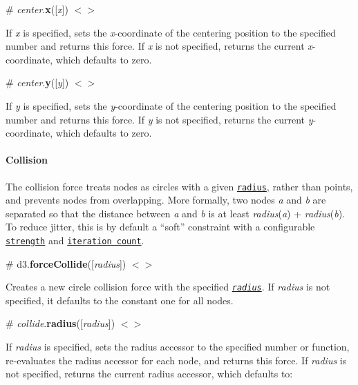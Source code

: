 \label{_center_x}%
\# {\itshape center}.{\bfseries x}(\mbox{[}{\itshape x}\mbox{]}) \href{https://github.com/d3/d3-force/blob/master/src/center.js#L27}{\tt $<$$>$}

If {\itshape x} is specified, sets the {\itshape x}-\/coordinate of the centering position to the specified number and returns this force. If {\itshape x} is not specified, returns the current {\itshape x}-\/coordinate, which defaults to zero.

\label{_center_y}%
\# {\itshape center}.{\bfseries y}(\mbox{[}{\itshape y}\mbox{]}) \href{https://github.com/d3/d3-force/blob/master/src/center.js#L31}{\tt $<$$>$}

If {\itshape y} is specified, sets the {\itshape y}-\/coordinate of the centering position to the specified number and returns this force. If {\itshape y} is not specified, returns the current {\itshape y}-\/coordinate, which defaults to zero.

\paragraph*{Collision}

The collision force treats nodes as circles with a given \href{#collide_radius}{\tt radius}, rather than points, and prevents nodes from overlapping. More formally, two nodes {\itshape a} and {\itshape b} are separated so that the distance between {\itshape a} and {\itshape b} is at least {\itshape radius}({\itshape a}) + {\itshape radius}({\itshape b}). To reduce jitter, this is by default a “soft” constraint with a configurable \href{#collide_strength}{\tt strength} and \href{#collide_iterations}{\tt iteration count}.

\label{_forceCollide}%
\# d3.{\bfseries force\+Collide}(\mbox{[}{\itshape radius}\mbox{]}) \href{https://github.com/d3/d3-force/blob/master/src/collide.js}{\tt $<$$>$}

Creates a new circle collision force with the specified \href{#collide_radius}{\tt {\itshape radius}}. If {\itshape radius} is not specified, it defaults to the constant one for all nodes.

\label{_collide_radius}%
\# {\itshape collide}.{\bfseries radius}(\mbox{[}{\itshape radius}\mbox{]}) \href{https://github.com/d3/d3-force/blob/master/src/collide.js#L86}{\tt $<$$>$}

If {\itshape radius} is specified, sets the radius accessor to the specified number or function, re-\/evaluates the radius accessor for each node, and returns this force. If {\itshape radius} is not specified, returns the current radius accessor, which defaults to\+:


